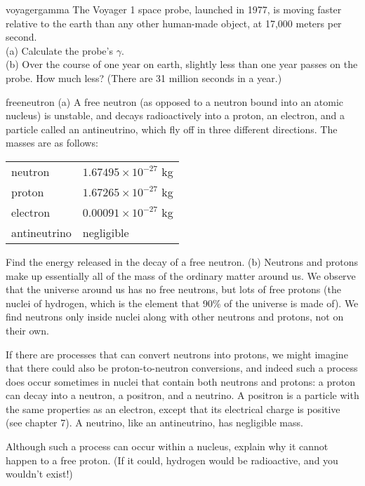 \begin{hwsection}
\begin{hw}{voyagergamma}
The Voyager 1 space probe, launched in 1977, is moving faster relative to the earth than
any other human-made object, at 17,000 meters per second. \\
(a) Calculate the probe's $\gamma$. \\
(b) Over the course of one year on earth, slightly less than one year passes on the probe.
How much less? (There are 31 million seconds in a year.)
\end{hw}

\begin{hw}{freeneutron}
(a) A free neutron (as opposed to a neutron bound into
an atomic nucleus) is unstable, and decays radioactively
into a proton, an electron, and a particle called an
antineutrino, which fly off in three different directions.
 The masses are as follows:

\qquad\begin{tabular}{ll}
	neutron	        & $1.67495\times10^{-27}$  kg\\
	proton	        & $1.67265\times10^{-27}$  kg\\
	electron	& $0.00091\times10^{-27}$  kg\\
	antineutrino	& negligible\\
\end{tabular}

\noindent Find the energy released in the decay of a free neutron. \hwendpart
(b) Neutrons and protons make up essentially all of the mass of the ordinary
matter around us. We observe that the universe around us has no free neutrons, but
lots of free protons
(the nuclei of hydrogen, which is the element that 90\% of the universe
is made of). We find neutrons only inside nuclei along with other neutrons and
protons, not on their own.

If there are processes that can convert neutrons into protons, we might imagine
that there could also be proton-to-neutron conversions, and indeed such a process
does occur sometimes in nuclei that contain both neutrons and protons:
a proton can decay into a
neutron, a positron, and a neutrino. A positron is a particle with the same
properties as an electron, except that its electrical charge is positive
(see chapter 7). A neutrino, like an antineutrino, has negligible mass.

Although such a process
can occur within a nucleus, explain why it cannot happen to
a free proton. (If it could, hydrogen would be radioactive, and you
wouldn't exist!)
\end{hw}


\end{hwsection}
